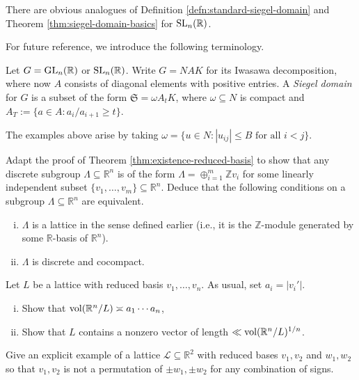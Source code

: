 \documentclass[reqno]{amsart} 
\begin{document}
There are obvious analogues of Definition \ref{defn:standard-siegel-domain} and Theorem \ref{thm:siegel-domain-basics} for $\operatorname{SL}_n(\mathbb{R})$.

For future reference, we introduce the following terminology.
\begin{definition}\label{defn:siegel-domain}
  Let $G = \operatorname{GL}_n(\mathbb{R})$ or $\operatorname{SL}_n(\mathbb{R})$.  Write $G = N A K$ for its Iwasawa decomposition, where now $A$ consists of diagonal elements with positive entries.  A \emph{Siegel domain} for $G$ is a subset of the form $\mathfrak{S} = \omega A_t K$, where $\omega \subseteq N$ is compact and $A_T := \{a \in A : a_i/a_{i+1} \geq t\}$.
\end{definition}
The examples above arise by taking $\omega = \{u \in N : |u_{i j} | \leq B \text{ for all } i < j\}$.


\begin{exercise}
  Adapt the proof of Theorem \ref{thm:existence-reduced-basis} to show that any discrete subgroup $\Lambda \subseteq \mathbb{R}^n$ is of the form $\Lambda = \oplus_{i=1}^m \mathbb{Z} v_i$ for some linearly independent subset $\{v_1,\dotsc,v_m\} \subseteq \mathbb{R}^n$.  Deduce that the following conditions on a subgroup $\Lambda \subseteq \mathbb{R}^n$ are equivalent.
  \begin{enumerate} [(i)]
  \item $\Lambda$ is a lattice in the sense defined earlier (i.e., it is the $\mathbb{Z}$-module generated by some $\mathbb{R}$-basis of $\mathbb{R}^n$).
  \item $\Lambda$ is discrete and cocompact.
  \end{enumerate}
\end{exercise}


\begin{exercise}
  Let $L$ be a lattice with reduced basis $v_1,\dotsc,v_n$.  As usual, set $a_i = |v_i'|$.
  \begin{enumerate} [(i)]
  \item Show that $\operatorname{vol}(\mathbb{R}^n/L) \asymp a_1 \dotsb a_n$,
  \item Show that $L$ contains a nonzero vector of length $\ll \operatorname{vol}(\mathbb{R}^n/L)^{1/n}$.
  \end{enumerate}
\end{exercise}

\begin{exercise}
  Give an explicit example of a lattice $\mathcal{L} \subseteq \mathbb{R}^2$ with reduced bases $v_1, v_2$ and $w_1, w_2$ so that $v_1, v_2$ is not a permutation of $\pm w_1, \pm w_2$ for any combination of signs.
\end{exercise}
\end{document}
